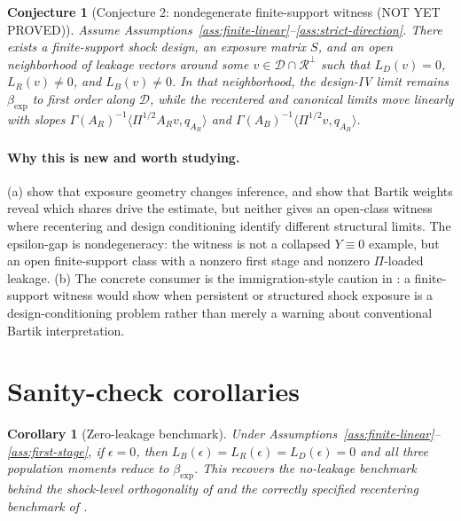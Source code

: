 \documentclass[11pt]{article}
\theoremstyle{definition}
\theoremstyle{plain}
\newtheorem{conjecture}{Conjecture}
\newtheorem{corollary}{Corollary}
\theoremstyle{remark}
\begin{document}
\begin{conjecture}[Conjecture 2: nondegenerate finite-support witness (NOT YET PROVED)]\label{conj:witness}
Assume Assumptions~\ref{ass:finite-linear}--\ref{ass:strict-direction}.  There exists a finite-support shock design, an exposure matrix \(S\), and an open neighborhood of leakage vectors around some \(v\in\mathcal D\cap\mathcal R^\perp\) such that \(L_D(v)=0\), \(L_R(v)\ne0\), and \(L_B(v)\ne0\).  In that neighborhood, the design-IV limit remains \(\beta_{\exp}\) to first order along \(\mathcal D\), while the recentered and canonical limits move linearly with slopes \(\Gamma(A_R)^{-1}\langle \Pi^{1/2}A_Rv,q_{A_R}\rangle\) and \(\Gamma(A_B)^{-1}\langle \Pi^{1/2}v,q_{A_B}\rangle\).
\end{conjecture}
\paragraph{Why this is new and worth studying.}
(a) \citet{AdaoKolesarMorales2019QJE} show that exposure geometry changes inference, and \citet{GoldsmithPinkhamSorkinSwift2020AER} show that Bartik weights reveal which shares drive the estimate, but neither gives an open-class witness where recentering and design conditioning identify different structural limits.  The epsilon-gap is nondegeneracy: the witness is not a collapsed \(Y\equiv0\) example, but an open finite-support class with a nonzero first stage and nonzero \(\Pi\)-loaded leakage.  (b) The concrete consumer is the immigration-style caution in \citet{JaegerRuistStuhler2018NBER}: a finite-support witness would show when persistent or structured shock exposure is a design-conditioning problem rather than merely a warning about conventional Bartik interpretation.

\section{Sanity-check corollaries}
\begin{corollary}[Zero-leakage benchmark]\label{cor:zero-leakage}
Under Assumptions~\ref{ass:finite-linear}--\ref{ass:first-stage}, if \(\epsilon=0\), then \(L_B(\epsilon)=L_R(\epsilon)=L_D(\epsilon)=0\) and all three population moments reduce to \(\beta_{\exp}\).  This recovers the no-leakage benchmark behind the shock-level orthogonality of \citet{BorusyakHullJaravel2022REStud} and the correctly specified recentering benchmark of \citet{BorusyakHull2023Econometrica}.
\end{corollary}
\end{document}
